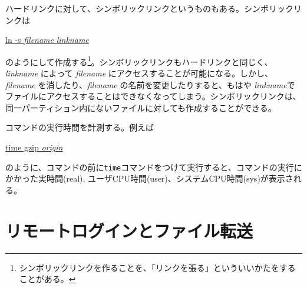 \begin{itemize}
ハードリンクに対して、シンボリックリンクというものもある。シンボリックリンクは
\begin{commandline2}
\prompt \underline{ln -s {\it filename} {\it linkname}}
\end{commandline2} \noindent
のようにして作成する\footnote{シンボリックリンクを作ることを、「リンクを張る」といういいかたをすることがある。}。シンボリックリンクもハードリンクと同じく、{\it linkname} によって {\it filename} にアクセスすることが可能になる。しかし、 {\it filename} を消したり、{\it filename} の名前を変更したりすると、もはや {\it linkname}でファイルにアクセスすることはできなくなってしまう。シンボリックリンクは、同一パーティション内にないファイルに対しても作成することができる。


コマンドの実行時間を計測する。例えば
\begin{commandline2}
\prompt \underline{time gzip {\it origin}}
\end{commandline2} \noindent
のように、コマンドの前に{\tt time}コマンドをつけて実行すると、コマンドの実行にかかった実時間(real), ユーザCPU時間(user)、システムCPU時間(sys)が表示される。

\end{itemize}

\section{リモートログインとファイル転送}
\label{sec:ssh}

